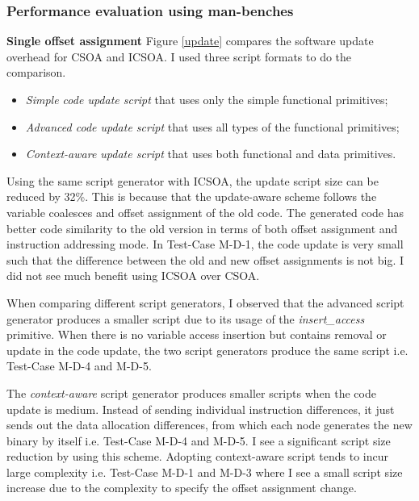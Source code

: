 \subsubsection{Performance evaluation using man-benches}
\textbf{Single offset assignment}
Figure \ref{update} compares the software update overhead for CSOA and ICSOA. I used three script formats to do the 
comparison.
\begin{itemize}
\itemsep 0pt
\item
{\it Simple code update script} that uses only the simple functional primitives;
\item
{\it Advanced code update script} that uses all types of the functional primitives;
\item
{\it Context-aware update script} that uses both functional and data primitives.
\end{itemize}

Using the same script generator with ICSOA, the update script size can be reduced by 32\%.
This is because that the update-aware scheme follows the variable coalesces and offset assignment of the old code. The 
generated code has better code similarity to the old version in terms of both offset assignment and instruction 
addressing mode. In Test-Case M-D-1, the code update is very small such that the difference between the old and new 
offset assignments is not big. I did not see much benefit using ICSOA over CSOA. 

When comparing different script generators, I observed that  the advanced script generator produces a smaller script 
due to its usage of the {\it insert\_access} primitive. When there is no variable access insertion but contains removal 
or update in the code update, the two script generators produce the same script i.e. Test-Case M-D-4 and M-D-5.


The {\em context-aware} script generator produces smaller scripts when the code update is medium. Instead of sending 
individual instruction differences, it just sends out the data allocation differences, from which each node generates 
the new binary by itself i.e. Test-Case M-D-4 and M-D-5. I see a significant script size reduction by using this 
scheme. 
Adopting context-aware script tends to incur large complexity i.e. Test-Case M-D-1 and M-D-3 where I see a small script 
size increase due to the complexity to specify the offset assignment change. 


